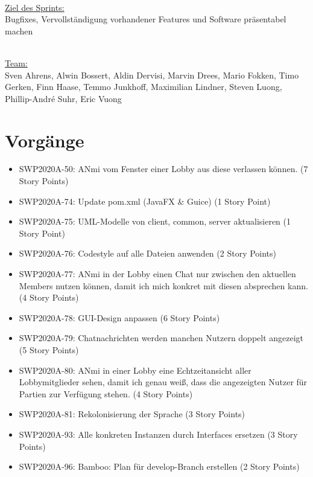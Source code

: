 \documentclass[12pt,a4paper, oneside]{article}
\begin{document}
    \noindent
    \\
    \underline{Ziel des Sprints:}
    \\
    Bugfixes, Vervollständigung vorhandener Features und Software präsentabel machen


    \noindent
    \\
    \underline {Team:}
    \\
    Sven Ahrens, Alwin Bossert, Aldin Dervisi, Marvin Drees, Mario Fokken,
    Timo Gerken, Finn Haase, Temmo Junkhoff, Maximilian Lindner, Steven Luong, Phillip-André Suhr, Eric Vuong


    \section{Vorgänge}

    \begin{itemize}

        \item SWP2020A-50: ANmi vom Fenster einer Lobby aus diese verlassen können. (7 Story Points)

        \item SWP2020A-74: Update pom.xml (JavaFX & Guice) (1 Story Point)

        \item SWP2020A-75: UML-Modelle von client, common, server aktualisieren (1 Story Point)

        \item SWP2020A-76: Codestyle auf alle Dateien anwenden (2 Story Points)

        \item SWP2020A-77: ANmi in der Lobby einen Chat nur zwischen den aktuellen Members nutzen können, damit ich mich konkret mit diesen absprechen kann. (4 Story Points)

        \item SWP2020A-78: GUI-Design anpassen (6 Story Points)

        \item SWP2020A-79: Chatnachrichten werden manchen Nutzern doppelt angezeigt (5 Story Points)

        \item SWP2020A-80: ANmi in einer Lobby eine Echtzeitansicht aller Lobbymitglieder sehen, damit ich genau weiß, dass die angezeigten Nutzer für Partien zur Verfügung stehen. (4 Story Points)

        \item SWP2020A-81: Rekolonisierung der Sprache (3 Story Points)

        \item SWP2020A-93: Alle konkreten Instanzen durch Interfaces ersetzen (3 Story Points)

        \item SWP2020A-96: Bamboo: Plan für develop-Branch erstellen (2 Story Points)

    \end{itemize}
\end{document}

